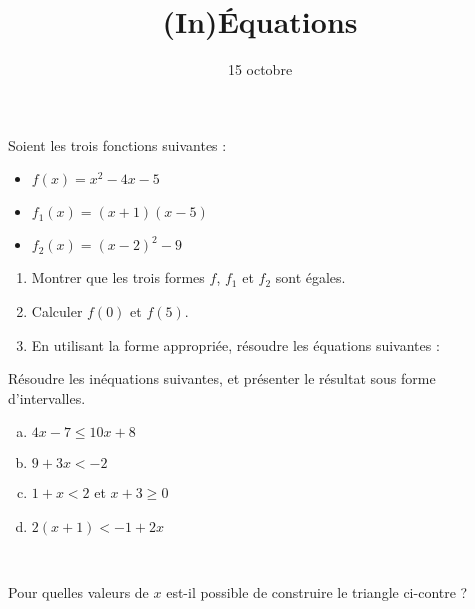 \documentclass[12pt]{article}
\title{(In)Équations}
\date{15 octobre}
\begin{document}
\maketitle
\begin{exercice}
  Soient les trois fonctions suivantes :
  \begin{itemize}[$\bullet$]
    \item $f(x)=x^2-4x-5$
    \item $f_1(x)=\left( x+1 \right)\left( x-5 \right)$
    \item $f_2(x)=\left( x-2 \right)^2-9$
  \end{itemize}
  
  \begin{enumerate}
    \item Montrer que les trois formes $f$, $f_1$ et $f_2$ sont égales.
    \item Calculer $f(0)$ et $f(5)$.
    \item En utilisant la forme appropriée, résoudre les équations suivantes :

  \end{enumerate}
\end{exercice}

\begin{exercice}[Inéquations]
  Résoudre les inéquations suivantes, et présenter le résultat sous forme d'intervalles.
  \begin{multicols}{2}
    \begin{enumerate}[(a)]
      \item $4x-7\leq 10x+8$
      \item $9+3x<-2$
      \item $1+x<2$ et $x+3\geq 0$
      \item $2\left( x+1 \right)<-1+2x$
    \end{enumerate}
\end{multicols}
\end{exercice}

\begin{exercice}~
  \begin{multicols}{2}
  Pour quelles valeurs de $x$ est-il possible de construire le triangle ci-contre ?


\end{multicols}
\end{exercice}
\end{document}
